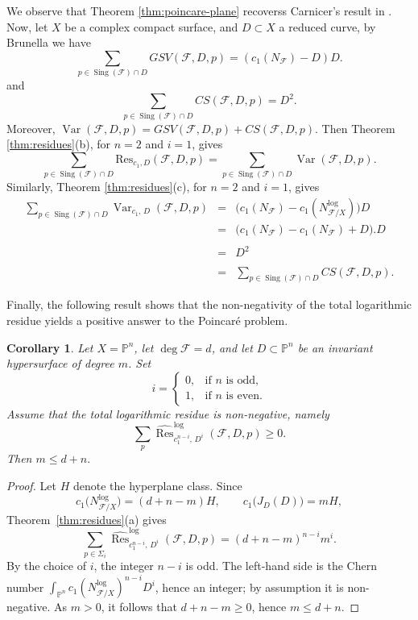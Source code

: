 \documentclass[12pt,reqno,a4paper]{amsart}
\numberwithin{equation}{section}
\theoremstyle{plain}
\newtheorem{corollary}[corollary]{Corollary}
\theoremstyle{definition}
\DeclareMathOperator{\Sing}{Sing}
\DeclareMathOperator{\Var}{Var}
\newcommand{\cF}{\mathcal{F}}
\begin{document}
 
We observe that Theorem \ref{thm:poincare-plane} recoverss Carnicer's result in \cite[Theorem p. 289]{Carnicer}. Now, let $X$ be a complex compact surface, and $D \subset X$ a reduced curve, by Brunella \cite{brunella} we have
$$\sum_{p \in \Sing(\cF)\cap D} GSV(\cF, D,p) =(c_1(N_{\cF}) - D)D.$$
and
$$\sum_{p \in \Sing(\cF)\cap D} CS(\cF, D,p) =D^{2}.$$
Moreover, $\Var(\cF,D,p) = GSV(\cF,D,p)+CS(\cF,D,p). $
Then Theorem \ref{thm:residues}\textup{(b)}, for $n=2$ and $i=1$, gives
$$\displaystyle \sum_{p \in \Sing(\cF)\cap D}{\mbox{Res}}_{c_1, D}(\cF,D,p)= \displaystyle \sum_{p \in \Sing(\cF)\cap D}\Var(\cF,D,p).$$
Similarly, Theorem \ref{thm:residues}\textup{(c)}, for $n=2$ and $i=1$, gives
$$
\begin{array}{ccl}
\displaystyle \sum_{p \in \Sing(\cF)\cap D}\Var_{c_1,\,D}(\cF,D,p)&=& \Big(c_{1}(N_{\cF}) - c_{1}(N_{\cF/X}^{\log})\Big)D \\
&=& \Big(c_{1}(N_{\cF}) - c_{1}(N_{\cF}) + D\Big) . D \\ \\
&=& D^{2} \\ \\
&=& \displaystyle \sum_{p \in \Sing(\cF)\cap D} CS(\cF, D,p).
\end{array}
$$

Finally, the following result shows that the non-negativity of the total logarithmic residue yields a positive answer to the Poincar\'e problem.
\begin{corollary}
Let \(X=\mathbb P^n\), let \(\deg \cF=d\), and let
\(D\subset\mathbb P^n\) be an invariant hypersurface of degree \(m\). Set
\[
i=
\begin{cases}
0, & \text{if } n \text{ is odd},\\
1, & \text{if } n \text{ is even}.
\end{cases}
\]
Assume that the total logarithmic residue is non-negative, namely
\[
\sum_p
\widehat{\operatorname{Res}}^{\log}_{c_1^{n-i},\,D^i}
(\cF,D,p)\geq 0.
\]
Then
$
m\leq d+n.
$
\end{corollary}


\begin{proof}
Let \(H\) denote the hyperplane class. Since
\[
c_1\bigl(N^{\log}_{\cF/X}\bigr)=(d+n-m)H,
\qquad
c_1\bigl(J_D(D)\bigr)=mH,
\]
Theorem~\ref{thm:residues}\textup{(a)} gives
\[
\sum_{p\in\Sigma_i}
\widehat{\operatorname{Res}}^{\log}_{c_1^{n-i},\,D^i}
(\cF,D,p)
=
(d+n-m)^{n-i}m^i.
\]
By the choice of \(i\), the integer \(n-i\) is odd. The left-hand side is the
Chern number \(\int_{\mathbb P^n}c_1(N^{\log}_{\cF/X})^{n-i}D^i\), hence an
integer; by assumption it is non-negative. As \(m>0\), it follows that
\(d+n-m\geq 0\), hence
$
m\leq d+n.
$
\end{proof}
\end{document}
